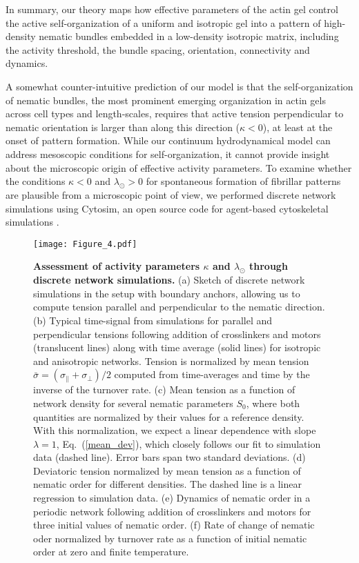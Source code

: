 In summary, our theory maps how effective parameters of the actin gel control the active self-organization of a uniform and isotropic gel into a pattern of high-density nematic bundles embedded in a low-density isotropic matrix, including the activity threshold, the bundle spacing, orientation, connectivity and dynamics. 

\medskip
{} A somewhat counter-intuitive prediction of our model is that the self-organization of nematic bundles, the most prominent emerging organization in actin gels across cell types and length-scales, requires that active tension perpendicular to nematic orientation is larger than along this direction ($\kappa<0$), at least at the onset of pattern formation. %
While our continuum hydrodynamical model can address mesoscopic conditions for self-organization, it cannot provide insight about the microscopic origin of effective activity parameters. To examine whether the conditions $\kappa<0$ and $\lambda_\odot>0$ for spontaneous formation of fibrillar patterns are plausible from a microscopic point of view, we performed discrete network simulations using Cytosim, an open source code for agent-based cytoskeletal simulations \cite{Nedelec2007}. 


\begin{figure}[t]
	\centering
	\texttt{[image: Figure\_4.pdf]}
	\caption{{\bf Assessment of activity parameters $\kappa$ and $\lambda_\odot$ through discrete network simulations.} (a) Sketch of discrete network simulations in the setup with boundary anchors, allowing us to compute tension parallel and perpendicular to the nematic direction. (b) Typical time-signal from simulations for parallel and perpendicular tensions following addition of crosslinkers and motors (translucent lines) along with time average (solid lines) for isotropic and anisotropic networks. Tension is normalized by mean tension $\bar{\sigma} = (\sigma_{||}+\sigma_{\bot})/2$ computed from time-averages and time by the inverse of the turnover rate. (c) Mean tension as a function of network density for several nematic parameters $S_0$, where both quantities are normalized by their values for a reference density. With this normalization, we expect a linear dependence with slope $\lambda = 1$, Eq.~(\ref{mean_dev}), which closely follows our fit to simulation data (dashed line). Error bars span two standard deviations. (d) Deviatoric tension normalized by mean tension as a function of nematic order for different densities. The dashed line is a linear regression to simulation data. (e) Dynamics  of nematic order in a periodic network following addition of crosslinkers and motors for three initial values of nematic order. (f) Rate of change of nematic oder normalized by turnover rate as a function of initial nematic order at zero and finite temperature. }
	\label{fig4.4}
\end{figure} 

